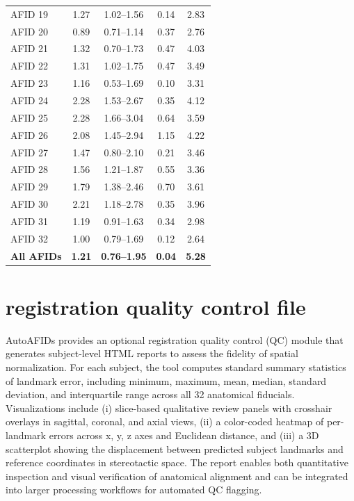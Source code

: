 \begin{table}[H]
\begin{tabular}{lcccc}
AFID 19 & 1.27 & 1.02--1.56 & 0.14 & 2.83 \\
AFID 20 & 0.89 & 0.71--1.14 & 0.37 & 2.76 \\
AFID 21 & 1.32 & 0.70--1.73 & 0.47 & 4.03 \\
AFID 22 & 1.31 & 1.02--1.75 & 0.47 & 3.49 \\
AFID 23 & 1.16 & 0.53--1.69 & 0.10 & 3.31 \\
AFID 24 & 2.28 & 1.53--2.67 & 0.35 & 4.12 \\
AFID 25 & 2.28 & 1.66--3.04 & 0.64 & 3.59 \\
AFID 26 & 2.08 & 1.45--2.94 & 1.15 & 4.22 \\
AFID 27 & 1.47 & 0.80--2.10 & 0.21 & 3.46 \\
AFID 28 & 1.56 & 1.21--1.87 & 0.55 & 3.36 \\
AFID 29 & 1.79 & 1.38--2.46 & 0.70 & 3.61 \\
AFID 30 & 2.21 & 1.18--2.78 & 0.35 & 3.96 \\
AFID 31 & 1.19 & 0.91--1.63 & 0.34 & 2.98 \\
AFID 32 & 1.00 & 0.79--1.69 & 0.12 & 2.64 \\
\midrule
\textbf{All AFIDs} & \textbf{1.21} & \textbf{0.76--1.95} & \textbf{0.04} & \textbf{5.28} \\
\bottomrule
\end{tabular}
\end{table}

\newpage
\section{registration quality control file}
AutoAFIDs provides an optional registration quality control (QC) module that generates subject-level HTML reports to assess the fidelity of spatial normalization. For each subject, the tool computes standard summary statistics of landmark error, including minimum, maximum, mean, median, standard deviation, and interquartile range across all 32 anatomical fiducials. Visualizations include (i) slice-based qualitative review panels with crosshair overlays in sagittal, coronal, and axial views, (ii) a color-coded heatmap of per-landmark errors across x, y, z axes and Euclidean distance, and (iii) a 3D scatterplot showing the displacement between predicted subject landmarks and reference coordinates in stereotactic space. The report enables both quantitative inspection and visual verification of anatomical alignment and can be integrated into larger processing workflows for automated QC flagging.

